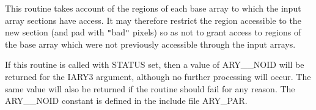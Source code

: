 \documentclass[twoside,11pt,nolof]{starlink}
\begin{document}
{{{         \sstitem
         This routine takes account of the regions of each base array
         to which the input array sections have access. It may therefore
         restrict the region accessible to the new section (and pad with
         \texttt{"}bad\texttt{"} pixels) so as not to grant access to regions of the base
         array which were not previously accessible through the input
         arrays.

         \sstitem
         If this routine is called with STATUS set, then a value of
         ARY\_\_NOID will be returned for the IARY3 argument, although no
         further processing will occur. The same value will also be
         returned if the routine should fail for any reason. The ARY\_\_NOID
         constant is defined in the include file ARY\_PAR.
      }
   }
}
\end{document}
